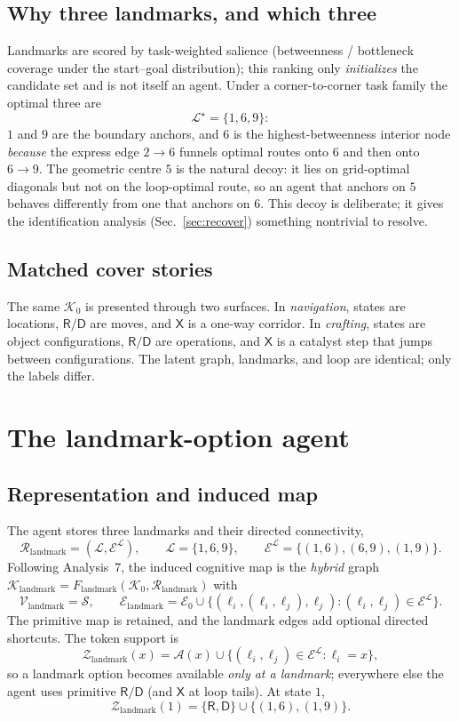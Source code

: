 \documentclass[11pt]{article}
\begin{document}
\subsection{Why three landmarks, and which three}

Landmarks are scored by task-weighted salience (betweenness / bottleneck coverage under
the start--goal distribution); this ranking only \emph{initializes} the candidate set and
is not itself an agent. Under a corner-to-corner task family the optimal three are
\[
\mathcal L^\star=\{1,6,9\}:
\]
$1$ and $9$ are the boundary anchors, and $6$ is the highest-betweenness interior node
\emph{because} the express edge $2\!\to\!6$ funnels optimal routes onto $6$ and then onto
$6\!\to\!9$. The geometric centre $5$ is the natural decoy: it lies on grid-optimal
diagonals but not on the loop-optimal route, so an agent that anchors on $5$ behaves
differently from one that anchors on $6$. This decoy is deliberate; it gives the
identification analysis (Sec.~\ref{sec:recover}) something nontrivial to resolve.

\subsection{Matched cover stories}

The same $\mathcal K_0$ is presented through two surfaces. In \emph{navigation}, states are
locations, $\mathsf R/\mathsf D$ are moves, and $\mathsf X$ is a one-way corridor. In
\emph{crafting}, states are object configurations, $\mathsf R/\mathsf D$ are operations,
and $\mathsf X$ is a catalyst step that jumps between configurations. The latent graph,
landmarks, and loop are identical; only the labels differ.

\section{The landmark-option agent}

\subsection{Representation and induced map}

The agent stores three landmarks and their directed connectivity,
\[
\mathcal R_{\mathrm{landmark}}=(\mathcal L,\mathcal E^{\mathcal L}),
\qquad
\mathcal L=\{1,6,9\},
\qquad
\mathcal E^{\mathcal L}=\{(1,6),(6,9),(1,9)\}.
\]
Following Analysis~7, the induced cognitive map is the \emph{hybrid} graph
$\mathcal K_{\mathrm{landmark}}=F_{\mathrm{landmark}}(\mathcal K_0,\mathcal R_{\mathrm{landmark}})$ with
\[
\mathcal V_{\mathrm{landmark}}=\mathcal S,
\qquad
\mathcal E_{\mathrm{landmark}}
=\mathcal E_0\cup
\{(\ell_i,(\ell_i,\ell_j),\ell_j):(\ell_i,\ell_j)\in\mathcal E^{\mathcal L}\}.
\]
The primitive map is retained, and the landmark edges add optional directed shortcuts. The
token support is
\[
\mathcal Z_{\mathrm{landmark}}(x)
=\mathcal A(x)\cup
\{(\ell_i,\ell_j)\in\mathcal E^{\mathcal L}:\ell_i=x\},
\]
so a landmark option becomes available \emph{only at a landmark}; everywhere else the
agent uses primitive $\mathsf R/\mathsf D$ (and $\mathsf X$ at loop tails). At state $1$,
\[
\mathcal Z_{\mathrm{landmark}}(1)
=\{\mathsf R,\mathsf D\}\cup\{(1,6),(1,9)\}.
\]
\end{document}
